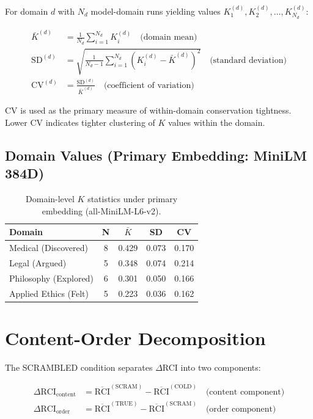 \documentclass[11pt,a4paper]{article}
\begin{document}
For domain $d$ with $N_d$ model-domain runs yielding values
$K_1^{(d)}, K_2^{(d)}, \ldots, K_{N_d}^{(d)}$:

\begin{align}
    \bar{K}^{(d)} &= \frac{1}{N_d} \sum_{i=1}^{N_d} K_i^{(d)}
    \quad \text{(domain mean)} \\[6pt]
    \text{SD}^{(d)} &= \sqrt{\frac{1}{N_d - 1} \sum_{i=1}^{N_d}
    \left(K_i^{(d)} - \bar{K}^{(d)}\right)^2}
    \quad \text{(standard deviation)} \\[6pt]
    \text{CV}^{(d)} &= \frac{\text{SD}^{(d)}}{\bar{K}^{(d)}}
    \quad \text{(coefficient of variation)}
\end{align}

CV is used as the primary measure of within-domain conservation tightness.
Lower CV indicates tighter clustering of $K$ values within the domain.

\subsection{Domain Values (Primary Embedding: MiniLM 384D)}

\begin{table}[H]
\centering
\begin{tabular}{lcccc}
\toprule
\textbf{Domain} & \textbf{N} & $\bar{K}$ & \textbf{SD} & \textbf{CV} \\
\midrule
Medical (Discovered)     & 8 & 0.429 & 0.073 & 0.170 \\
Legal (Argued)           & 5 & 0.348 & 0.074 & 0.214 \\
Philosophy (Explored)    & 6 & 0.301 & 0.050 & 0.166 \\
Applied Ethics (Felt)    & 5 & 0.223 & 0.036 & 0.162 \\
\bottomrule
\end{tabular}
\caption{Domain-level $K$ statistics under primary embedding (all-MiniLM-L6-v2).}
\end{table}

\section{Content-Order Decomposition}
\label{sec:content_order}

The SCRAMBLED condition separates $\Delta$RCI into two components:

\begin{align}
    \Delta\text{RCI}_{\text{content}} &= \overline{\text{RCI}}^{(\text{SCRAM})} -
    \overline{\text{RCI}}^{(\text{COLD})}
    \quad \text{(content component)} \\[4pt]
    \Delta\text{RCI}_{\text{order}} &= \overline{\text{RCI}}^{(\text{TRUE})} -
    \overline{\text{RCI}}^{(\text{SCRAM})}
    \quad \text{(order component)}
\end{align}
\end{document}
